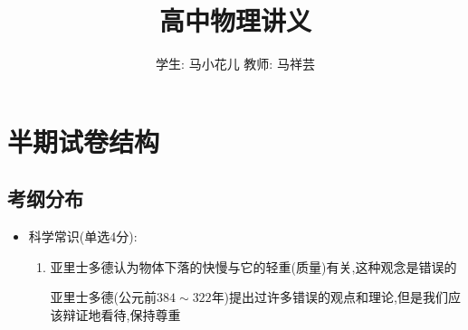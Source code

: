 \documentclass{article}
\title{高中物理讲义}
\author{学生: 马小花儿 \quad 教师: 马祥芸}
\begin{document}
\maketitle
\tableofcontents
\newpage
{}

\section{半期试卷结构}
\subsection{考纲分布}
\begin{itemize}
    \item 科学常识(单选4分):

          \begin{enumerate}
              \item 亚里士多德认为物体下落的快慢与它的轻重(质量)有关,这种观念是错误的

                    \vspace{-1em}

                    \hspace{-1em}\begin{adjustbox}{minipage=0.91\linewidth, bgcolor=gray!20, padding=1em}
                        \small %
                        亚里士多德(公元前$384\sim322$年)提出过许多错误的观点和理论,但是我们应该辩证地看待,保持尊重
                    \end{adjustbox}

                    \vspace{-1em}


\end{enumerate}
\end{itemize}
\end{document}
